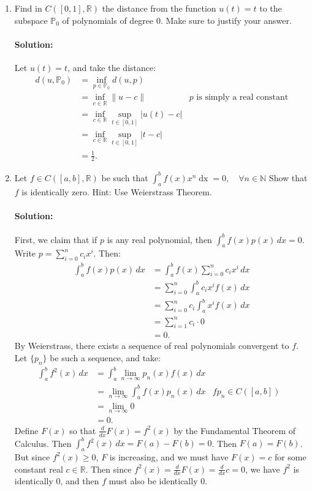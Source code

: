 \documentclass{article}
\begin{document}
\begin{enumerate}
\item  Find in $C([0,1],\mathbb{R})$ the distance from the function $u(t)=t$ to the subspace $\mathbb{P}_0$ of polynomials of degree $0.$ Make sure to justify your answer.
    \paragraph{Solution: }Let $u(t)=t$, and take the distance:
    \begin{align*}
        d(u,\mathbb{P}_0)&=\inf_{p\in \mathbb{P}_0}d(u,p)\\
        &= \inf_{c\in \mathbb{R}}\|u-c\| &\text{$p$ is simply a real constant}\\
        &= \inf_{c\in \mathbb{R}}\sup_{t\in [0,1]}|u(t)-c|\\
        &= \inf_{c\in \mathbb{R}}\sup_{t\in [0,1]}|t-c|\\
        &= \frac{1}{2}
    .\end{align*}

\item  Let $f\in C([a,b],\mathbb{R})$ be such that $\int_a^b f(x)x^n\operatorname{dx}=0,\quad\forall n\in\mathbb{N}$ Show that $f$ is identically zero. Hint: Use Weierstrass Theorem.
    \paragraph{Solution: }First, we claim that if $p$ is any real polynomial, then $\int_{a}^{b} f(x)p(x) \, d x =0$. Write $p=\sum_{i=0}^{n} c_ix^{i}$. Then:
    \begin{align*}
    \int_{a}^{b} f(x)p(x) \, d x &=\int_{a}^{b} f(x)\sum_{i=0}^{n} c_ix^{i} \, d x \\&=\sum_{i=0}^{n} \int_{a}^{b} c_ix^{i}f(x) \, d x \\&=\sum_{i=0}^{n}c_i \int_{a}^{b} x^{i}f(x) \, d x \\&=\sum_{i=1}^{n} c_i \cdot 0\\&=0
    .\end{align*}
    By Weierstrass, there exists a sequence of real polynomials convergent to $f$. Let $\{p_n\}$ be such a sequence, and take:
    \begin{align*}
        \int_{a}^{b} f^2(x) \, d x &= \int_{a}^{b} \lim_{n \to \infty} p_n(x) f(x)\, d x  \\
           &= \lim_{n \to \infty} \int_{a}^{b} f(x)p_n(x) \, d x  &\text{$fp_n\in C([a,b])$ }\\
        &= \lim_{n \to \infty} 0 \\
        &= 0 
    .\end{align*}
    Define $F(x)$ so that $\frac{d}{dx}F(x)=f^2(x)$ by the Fundamental Theorem of Calculus. Then $\int_{a}^{b} f^2(x) \, d x =F(a)-F(b)=0$. Then $F(a)=F(b)$. But since $f^2(x)\ge 0$, $F$ is increasing, and we must have $F(x)=c$ for some constant real $c\in \mathbb{R}$. Then since $f^2(x)=\frac{d}{dx}F(x)=\frac{d}{dx}c=0$, we have $f^2$ is identically $0$, and then $f$ must also be identically $0$.
\end{enumerate}
\end{document}
